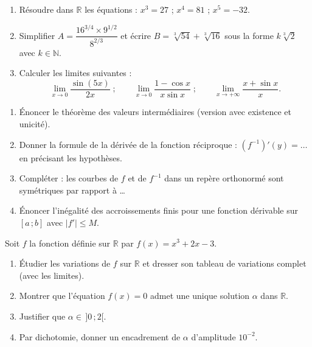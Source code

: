 \documentclass[11pt]{article}
\newcounter{popsec}
\newcounter{popsub}
\newcommand{\courssub}[1]{%
  \stepcounter{popsub}%
  \par\vspace{9pt}\noindent{\popxbold\fontsize{11.5}{13}\selectfont\color{popink}{\color{poporange}\thepopsec.\thepopsub}\hspace{6pt}#1}\par\nopagebreak\vspace{4pt}
}
\begin{document}
\begin{exercice}
\begin{enumerate}
\item Résoudre dans $\mathbb{R}$ les équations : $x^3=27$ ; $x^4=81$ ; $x^5=-32$.
\item Simplifier $A=\dfrac{16^{3/4}\times 9^{1/2}}{8^{2/3}}$ et écrire $B=\sqrt[3]{54}+\sqrt[3]{16}$ sous la forme $k\sqrt[3]{2}$ avec $k\in\mathbb{N}$.
\item Calculer les limites suivantes :
\[ \lim_{x\to 0}\frac{\sin(5x)}{2x}\;;\qquad \lim_{x\to 0}\frac{1-\cos x}{x\sin x}\;;\qquad \lim_{x\to+\infty}\frac{x+\sin x}{x}. \]
\end{enumerate}
\end{exercice}

\begin{exercice}
\begin{enumerate}
\item Énoncer le théorème des valeurs intermédiaires (version avec existence et unicité).
\item Donner la formule de la dérivée de la fonction réciproque : $(f^{-1})'(y)=\ldots$ en précisant les hypothèses.
\item Compléter : les courbes de $f$ et de $f^{-1}$ dans un repère orthonormé sont symétriques par rapport à \ldots
\item Énoncer l'inégalité des accroissements finis pour une fonction dérivable sur $[a\,;b]$ avec $|f'|\leq M$.
\end{enumerate}
\end{exercice}

\courssub{Je m'entraîne}

\begin{exercice}
Soit $f$ la fonction définie sur $\mathbb{R}$ par $f(x)=x^3+2x-3$.
\begin{enumerate}
\item Étudier les variations de $f$ sur $\mathbb{R}$ et dresser son tableau de variations complet (avec les limites).
\item Montrer que l'équation $f(x)=0$ admet une unique solution $\alpha$ dans $\mathbb{R}$.
\item Justifier que $\alpha\in\,]0\,;2[$.
\item Par dichotomie, donner un encadrement de $\alpha$ d'amplitude $10^{-2}$.
\end{enumerate}
\end{exercice}
\end{document}
